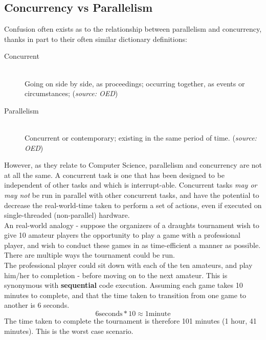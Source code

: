 \subsection{Concurrency vs Parallelism}
\label{sub:concurrencyparallelism}


Confusion often exists as to the relationship between parallelism and
concurrency, thanks in part to their often similar dictionary definitions:

\begin{description}
  \item[Concurrent] \hfill \\
  Going on side by side, as proceedings; occurring together, as events or
  circumstances; (\textit{source: OED})
  \item[Parallelism] \hfill \\
  Concurrent or contemporary; existing in the same period of time.
  (\textit{source: OED})
\end{description}

However, as they relate to Computer Science, parallelism and concurrency are not
at all the same. A concurrent task is one that has been designed to be
independent of other tasks and which is interrupt-able. Concurrent tasks
\emph{may or may not} be run in parallel with other concurrent tasks, and have
the potential to decrease the real-world-time taken to perform a set of actions,
even if executed on single-threaded (non-parallel) hardware. \\

An real-world analogy - suppose the organizers of a draughts tournament wish to
give 10 amateur players the opportunity to play a game with a professional
player, and wish to conduct these games in as time-efficient a manner as
possible. There are multiple ways the tournament could be run. \\

The professional player could sit down with each of the ten amateurs, and play
him/her to completion - before moving on to the next amateur. This is synonymous
with \textbf{sequential} code execution. Assuming each game takes 10 minutes to
complete, and that the time taken to transition from one game to another is 6
seconds. $$6 \text{seconds} * 10 \approx 1 \text{minute}$$
The time taken to complete the tournament is therefore 101 minutes (1 hour, 41
minutes). This is the worst case scenario. \\


